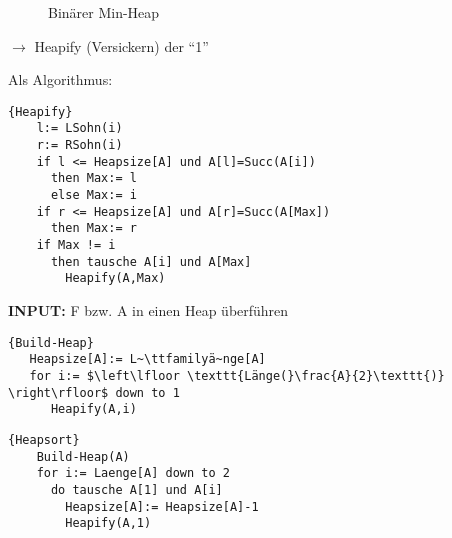 \begin{figure}[H]
	\centering\hspace{6mm}\hspace{6mm}
	\caption{Binärer Min-Heap}
	\label{101103f}
\end{figure}
$\rightarrow$ Heapify (Versickern) der "`1"' 

Als Algorithmus:
  \begin{Algorithmus}[ht]
  \begin{lstlisting}[frame=tlrb, mathescape=true, title=\textsc{Heapify\textnormal{(A)}}, gobble=4]{Heapify}
    l:= LSohn(i)
    r:= RSohn(i)
    if l <= Heapsize[A] und A[l]=Succ(A[i])
      then Max:= l
      else Max:= i
    if r <= Heapsize[A] und A[r]=Succ(A[Max])
      then Max:= r
    if Max != i
      then tausche A[i] und A[Max]
        Heapify(A,Max) 
    \end{lstlisting}
  \end{Algorithmus}

\textbf{INPUT:} F bzw. A in einen Heap überführen
\begin{Algorithmus}[ht]
\begin{lstlisting}[frame=tlrb, mathescape=true, title=\textsc{Build-Heap\textnormal{(A)}}, gobble=2]{Build-Heap}  
   Heapsize[A]:= L~\ttfamilyä~nge[A]
   for i:= $\left\lfloor \texttt{Länge(}\frac{A}{2}\texttt{)} \right\rfloor$ down to 1
      Heapify(A,i)
    \end{lstlisting}
  \end{Algorithmus}

  \begin{Algorithmus}[ht]
\begin{lstlisting}[frame=tlrb, mathescape=true, title=\textsc{Heapsort\textnormal{(A)}}, gobble=4]{Heapsort}
    Build-Heap(A)
    for i:= Laenge[A] down to 2
      do tausche A[1] und A[i]
        Heapsize[A]:= Heapsize[A]-1
        Heapify(A,1)
    \end{lstlisting}
  \end{Algorithmus}
  
